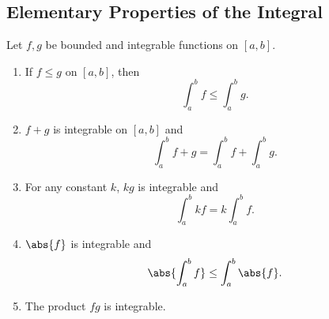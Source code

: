 \subsection{Elementary Properties of the Integral}
Let \(f,g\) be bounded and integrable functions on \([a,b]\).
\begin{enumerate}
    \item If \(f\leq g\) on \([a,b]\), then
    \[
        \int_a^b f \leq \int_a^b g.
    \]
    \item \(f + g\) is integrable on \([a,b]\) and
    \[
        \int_a^b f + g = \int_a^b f + \int_a^b g.
    \]
    \item For any constant \(k\), \(kg\) is integrable and
    \[
        \int_a^b kf = k\int^b_a f.
    \]
    \item \(\abs{f}\) is integrable and
    \[
        \abs{\int_a^b f} \leq \int^b_a\abs{f}.
    \]
    \item The product \(fg\) is integrable.
\end{enumerate}
